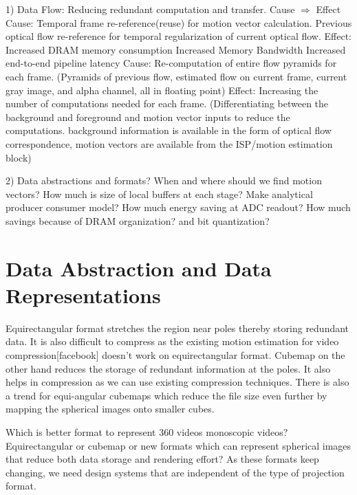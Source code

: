 1)  Data Flow: Reducing redundant computation and transfer.\newline
Cause $\Rightarrow$ Effect  \newline
Cause:\newline
Temporal frame re-reference(reuse) for motion vector calculation.\newline
Previous optical flow re-reference for temporal regularization of current optical flow.\newline
Effect: \newline
Increased DRAM memory consumption \newline
Increased Memory Bandwidth \newline
Increased end-to-end pipeline latency \newline
Cause: \newline
Re-computation of entire flow pyramids for each frame. (Pyramids of previous flow, estimated flow on current frame, current gray image, and alpha channel, all in floating point)\newline
Effect:\newline
Increasing the number of computations needed for each frame. \newline
(Differentiating between the background and foreground and motion vector inputs to reduce the computations. background information is available in the form of optical flow correspondence, motion vectors are available from the ISP/motion estimation block)\newline

2)  Data abstractions and formats?
When and where should we find motion vectors?
How much is size of local buffers at each stage? Make analytical producer consumer model?
How much energy saving at ADC readout?
How much savings because of DRAM organization? and bit quantization?

\section{Data Abstraction and Data Representations}
Equirectangular format stretches the region near poles thereby storing redundant data. It is also difficult to compress as the existing motion estimation for video compression[facebook] doesn’t work on equirectangular format. Cubemap on the other hand reduces the storage of redundant information at the poles. It also helps in compression as we can use existing compression techniques. There is also a trend for equi-angular cubemaps which reduce the file size even further by mapping the spherical images onto smaller cubes.\newline

Which is better format to represent 360 videos monoscopic videos? Equirectangular or cubemap or new formats which can represent spherical images that reduce both data storage and rendering effort? As these formats keep changing, we need design systems that are independent of the type of projection format. \newline
